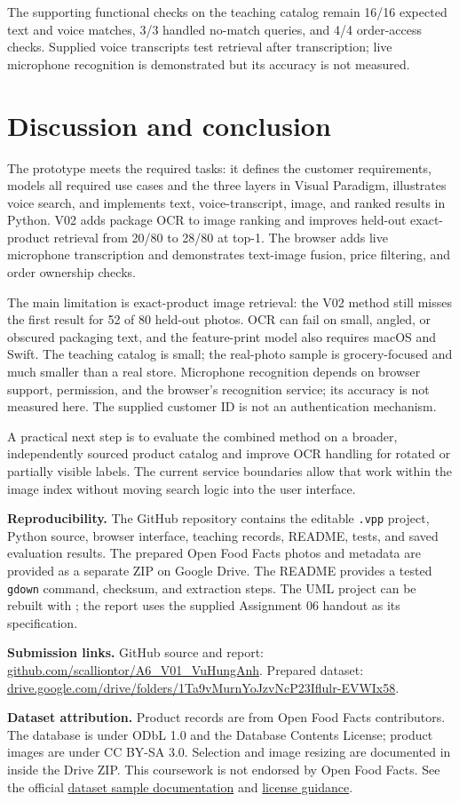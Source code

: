 \documentclass[11pt,a4paper]{article}
\newcommand{\code}[1]{\texttt{#1}}
\newcommand{\nextsection}[1]{\clearpage\section{#1}}
\begin{document}
The supporting functional checks on the teaching catalog remain 16/16 expected text and voice matches, 3/3 handled no-match queries, and 4/4 order-access checks. Supplied voice transcripts test retrieval after transcription; live microphone recognition is demonstrated but its accuracy is not measured.

\nextsection{Discussion and conclusion}
The prototype meets the required tasks: it defines the customer requirements, models all required use cases and the three layers in Visual Paradigm, illustrates voice search, and implements text, voice-transcript, image, and ranked results in Python. V02 adds package OCR to image ranking and improves held-out exact-product retrieval from 20/80 to 28/80 at top-1. The browser adds live microphone transcription and demonstrates text-image fusion, price filtering, and order ownership checks.

The main limitation is exact-product image retrieval: the V02 method still misses the first result for 52 of 80 held-out photos. OCR can fail on small, angled, or obscured packaging text, and the feature-print model also requires macOS and Swift. The teaching catalog is small; the real-photo sample is grocery-focused and much smaller than a real store. Microphone recognition depends on browser support, permission, and the browser's recognition service; its accuracy is not measured here. The supplied customer ID is not an authentication mechanism.

A practical next step is to evaluate the combined method on a broader, independently sourced product catalog and improve OCR handling for rotated or partially visible labels. The current service boundaries allow that work within the image index without moving search logic into the user interface.

\textbf{Reproducibility.} The GitHub repository contains the editable \code{.vpp} project, Python source, browser interface, teaching records, README, tests, and saved evaluation results. The prepared Open Food Facts photos and metadata are provided as a separate ZIP on Google Drive. The README provides a tested \code{gdown} command, checksum, and extraction steps. The UML project can be rebuilt with ; the report uses the supplied Assignment 06 handout as its specification.

\textbf{Submission links.} GitHub source and report: \href{https://github.com/scalliontor/A6_V01_VuHungAnh}{github.com/scalliontor/A6\_V01\_VuHungAnh}. Prepared dataset: \href{https://drive.google.com/drive/folders/1Ta9vMurnYoJzvNcP23Iflulr-EVWIx58?usp=sharing}{drive.google.com/drive/folders/1Ta9vMurnYoJzvNcP23Iflulr-EVWIx58}.

\textbf{Dataset attribution.} Product records are from Open Food Facts contributors. The database is under ODbL 1.0 and the Database Contents License; product images are under CC BY-SA 3.0. Selection and image resizing are documented in  inside the Drive ZIP. This coursework is not endorsed by Open Food Facts. See the official \href{https://github.com/openfoodfacts/openfoodfacts-ai/blob/develop/data-sets.md}{dataset sample documentation} and \href{https://openfoodfacts.github.io/documentation/docs/Product-Opener/api/tutorials/license-be-on-the-legal-side/}{license guidance}.
\end{document}
